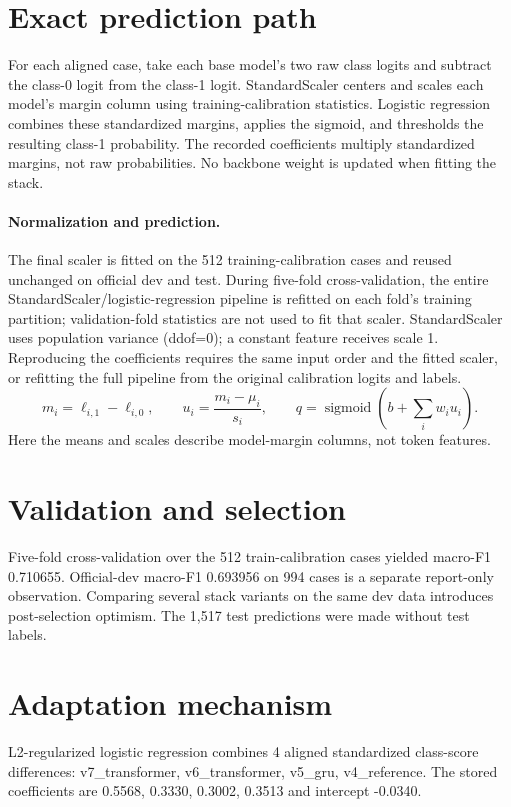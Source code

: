 \documentclass[11pt,a4paper]{article}
\begin{document}
\section{Exact prediction path}
For each aligned case, take each base model's two raw class logits and subtract the class-0 logit from the class-1 logit. StandardScaler centers and scales each model's margin column using training-calibration statistics. Logistic regression combines these standardized margins, applies the sigmoid, and thresholds the resulting class-1 probability. The recorded coefficients multiply standardized margins, not raw probabilities. No backbone weight is updated when fitting the stack.
\paragraph{Normalization and prediction.} The final scaler is fitted on the 512 training-calibration cases and reused unchanged on official dev and test. During five-fold cross-validation, the entire StandardScaler/logistic-regression pipeline is refitted on each fold's training partition; validation-fold statistics are not used to fit that scaler. StandardScaler uses population variance (ddof=0); a constant feature receives scale 1. Reproducing the coefficients requires the same input order and the fitted scaler, or refitting the full pipeline from the original calibration logits and labels.
\[ m_i=\ell_{i,1}-\ell_{i,0},\qquad u_i=\frac{m_i-\mu_i}{s_i},\qquad q=\operatorname{sigmoid}\!\left(b+\sum_i w_i u_i\right). \]
Here the means and scales describe model-margin columns, not token features.

\section{Validation and selection}
Five-fold cross-validation over the 512 train-calibration cases yielded macro-F1 0.710655. Official-dev macro-F1 0.693956 on 994 cases is a separate report-only observation. Comparing several stack variants on the same dev data introduces post-selection optimism. The 1,517 test predictions were made without test labels.
\section{Adaptation mechanism}
L2-regularized logistic regression combines 4 aligned standardized class-score differences: v7\_transformer, v6\_transformer, v5\_gru, v4\_reference. The stored coefficients are 0.5568, 0.3330, 0.3002, 0.3513 and intercept -0.0340.
\end{document}
